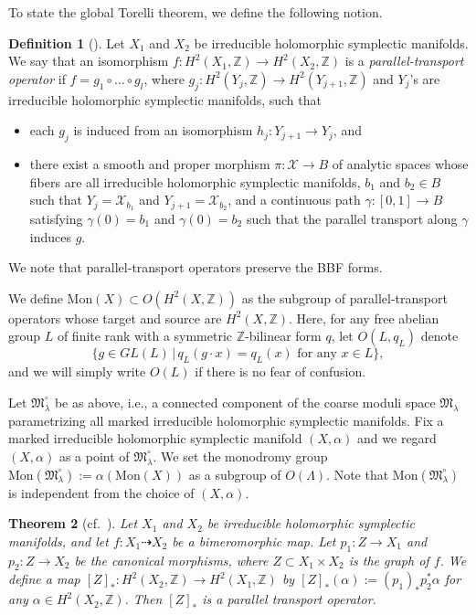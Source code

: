 \documentclass[12pt,twoside]{amsart}
\newtheorem{thm}{Theorem}[section]
\theoremstyle{definition}
\newtheorem{defn}[thm]{Definition}
\begin{document}
To state the global Torelli theorem, we define the following notion.
\begin{defn}[{\cite[Definition 1.1]{MarkmanSurvey}}]
Let $X_1$ and $X_2$ be irreducible holomorphic symplectic manifolds.
We say that an isomorphism $f\colon H^2(X_1,\mathbb{Z})\to H^2(X_2,\mathbb{Z})$ is a {\it parallel-transport operator} if $f=g_1\circ \ldots\circ g_l$, where $g_j\colon H^2(Y_j,\mathbb{Z})\to H^2(Y_{j+1},\mathbb{Z})$ and $Y_j$'s are irreducible holomorphic symplectic manifolds, such that
\begin{itemize}
\item each $g_{j}$ is induced from an isomorphism $h_{j} \colon Y_{j+1}\to Y_j$, and
    \item there exist a smooth and proper morphism $\pi\colon \mathcal{X}\to B$ of analytic spaces whose fibers are all irreducible holomorphic symplectic manifolds, $b_1$ and $b_2\in B$ such that $Y_{j}=\mathcal{X}_{b_1}$ and $Y_{j+1}=\mathcal{X}_{b_2}$, and a continuous path $\gamma\colon [0,1]\to B$ satisfying $\gamma(0)=b_1$ and $\gamma(0)=b_2$ such that the parallel transport along $\gamma$ induces $g$.
\end{itemize}
We note that parallel-transport operators preserve the BBF forms. 

We define $\mathrm{Mon}(X)\subset O(H^2(X,\mathbb{Z}))$ as the subgroup of parallel-transport operators whose target and source are $H^2(X,\mathbb{Z})$. 
Here, for any free abelian group $L$ of finite rank with a symmetric $\mathbb{Z}$-bilinear form $q$, let $O(L,q_L)$ denote
\[
\{g\in GL(L)\,|\,\text{$q_L(g\cdot x)=q_L(x)$ for any $x\in L$}\}, 
\]
and we will simply write $O(L)$ if there is no fear of confusion.

    Let $\mathfrak{M}_{\lambda}^\circ$ be as above, i.e., a connected component of the coarse moduli space $\mathfrak{M}_{\lambda}$ parametrizing all marked irreducible holomorphic symplectic manifolds. 
    Fix a marked irreducible holomorphic symplectic manifold $(X,\alpha)$ and we regard $(X,\alpha)$ as a point of $\mathfrak{M}_{\lambda}^\circ$.
    We set the monodromy group $\mathrm{Mon}(\mathfrak{M}_{\lambda}^\circ):=\alpha(\mathrm{Mon}(X))$ as a subgroup of $O(\Lambda)$. 
Note that $\mathrm{Mon}(\mathfrak{M}_{\lambda}^\circ)$ is independent from the choice of $(X,\alpha)$.
\end{defn}

\begin{thm}[cf.~{\cite[Proposition 25.14]{GHJ}}]\label{thm--birational--symplectic}
    Let $X_1$ and $X_2$ be irreducible holomorphic symplectic manifolds, and let $f \colon X_{1} \dashrightarrow X_{2}$ be a bimeromorphic map.
    Let $p_1\colon Z\to X_1$ and $p_2\colon Z\to X_2$ be the canonical morphisms, where $Z\subset X_1\times X_2$ is the graph of $f$. 
    We define a map $[Z]_*\colon H^2(X_2,\mathbb{Z})\to H^2(X_1,\mathbb{Z})$ by $[Z]_*(\alpha):=(p_1)_*p_2^*\alpha$ for any $\alpha\in H^2(X_2,\mathbb{Z})$. 
Then $[Z]_*$ is a parallel transport operator.
\end{thm}
\end{document}
